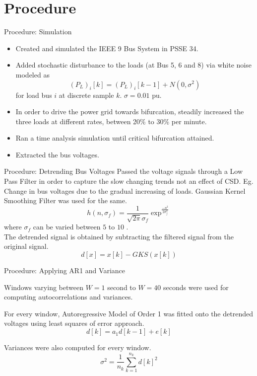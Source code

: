 \section[Procedure]{Procedure}
\label{sec:procedure}

\begin{frame}{Procedure: Simulation}
	\begin{itemize}
		\item Created and simulated the IEEE 9 Bus System in PSSE 34.
		\item Added stochastic disturbance to the loads (at Bus 5, 6 and 8) via white noise modeled as
			\begin{equation}
				(P_L)_{i}[k] = (P_L)_{i}[k-1] + N(0, \sigma^2)
			\end{equation}
		for load bus $i$ at discrete sample $k$.
		$\sigma = 0.01$ pu. 	
		\item In order to drive the power grid towards bifurcation, steadily increased the three loads at different rates, between 20\% to 30\% per minute.
		\item Ran a time analysis simulation until critical bifurcation attained. 
		\item Extracted the bus voltages. 
	\end{itemize}

\end{frame}

\begin{frame}{Procedure: Detrending Bus Voltages}
	Passed the voltage signals through a Low Pass Filter in order to capture the slow changing trends not an effect of CSD. 
	Eg. Change in bus voltages due to the gradual increasing of loads.
	Gaussian Kernel Smoothing Filter was used for the same.
	\begin{equation}
	\label{eq:gks}
		h(n, \sigma_f) = \frac{1}{\sqrt{2 \pi} \sigma_f} \exp^\frac{-n^2}{2 \sigma_f^2}
	\end{equation}
	where $\sigma_f$ can be varied between $5$ to $10$ .
	\\ The detrended signal is obtained by subtracting the filtered signal from the original signal.	
	\begin{equation}
	\label{eq:detrending}
		d[x] = x[k] - GKS(x[k])
	\end{equation} 
\end{frame}

\begin{frame}{Procedure: Applying AR1 and Variance}
	
	Windows varying between $W = 1$ second to $W = 40$ seconds were used for computing autocorrelations and variances.
	
	For every window, Autoregressive Model of Order 1 was fitted onto the detrended voltages using least squares of error approach.
	\begin{equation}
	\label{eq:autocorrDef}
	d[k] = a_1 d[k-1] + e[k]
	\end{equation} 
	
	Variances were also computed for every window.
	\begin{equation}
	\label{eq:varDef}
	\sigma^2 = \frac{1}{n_k} \sum_{k=1}^{n_k} d[k]^2
	\end{equation} 
\end{frame}